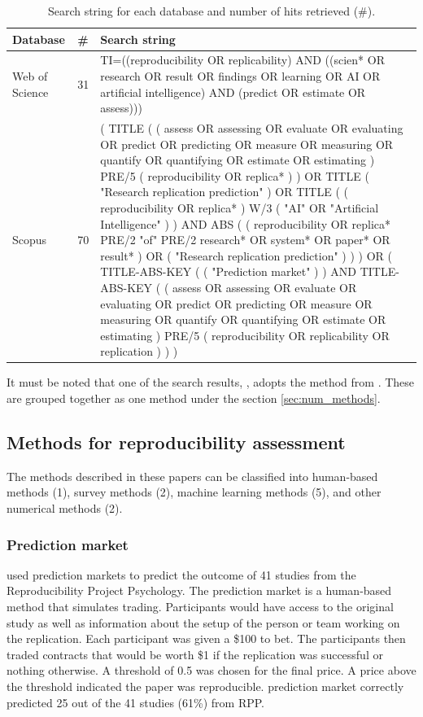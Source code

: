 \documentclass[12pt, a4paper, twocolumn]{article}
\begin{document}
	\begin{table}[htbp]
		\centering
		\caption[Search string for each database]{Search string for each database and number of hits retrieved (\#).}\label{tab:search_string_table}
		\small
			\begin{tabular}{llp{}}
			\hline
			Database & \# & Search string \\ \hline
			Web of Science & 31 & TI=((reproducibility OR replicability) AND ((scien* OR research OR result OR findings OR learning OR AI OR artificial intelligence) AND (predict OR estimate OR assess))) \\ 
			Scopus  & 70 & ( TITLE ( ( assess OR assessing OR evaluate OR evaluating OR predict OR predicting OR measure OR measuring OR quantify OR quantifying OR estimate OR estimating ) PRE/5 ( reproducibility OR replica* ) ) OR TITLE ( "Research replication prediction" ) OR TITLE ( ( reproducibility OR replica* ) W/3 ( "AI" OR "Artificial Intelligence" ) ) AND ABS ( ( reproducibility OR replica* PRE/2 "of" PRE/2 research* OR system* OR paper* OR result* ) OR ( "Research replication prediction" ) ) ) OR ( TITLE-ABS-KEY ( ( "Prediction market" ) )  AND  TITLE-ABS-KEY ( ( assess  OR  assessing  OR  evaluate  OR  evaluating  OR  predict  OR  predicting  OR  measure  OR  measuring  OR  quantify  OR  quantifying  OR  estimate  OR  estimating )  PRE/5  ( reproducibility  OR  replicability  OR  replication ) ) )  \\ \hline
			\end{tabular}
	\end{table} 

		It must be noted that one of the search results, \citet{raghupathi2022Reproducibility}, adopts the method from \citet{gundersen2018state}. These are grouped together as one method under the section \ref{sec:num_methods}.  

	\subsection{Methods for reproducibility assessment}\label{sec:methods}
	The methods described in these papers can be classified into human-based methods (1), survey methods (2), machine learning methods (5), and other numerical methods (2).

		\subsubsection{Prediction market}
			\citet{Dreber2015using} used prediction markets to predict the outcome of 41 studies from the Reproducibility Project Psychology. The prediction market is a human-based method that simulates trading. Participants would have access to the original study as well as information about the setup of the person or team working on the replication. Each participant was given a \$100 to bet. The participants then traded contracts that would be worth \$1 if the replication was successful or nothing otherwise. A threshold of 0.5 was chosen for the final price. A price above the threshold indicated the paper was reproducible. \citet{Dreber2015using} prediction market correctly predicted 25 out of the 41 studies (61\%) from RPP.
				
\end{document}
